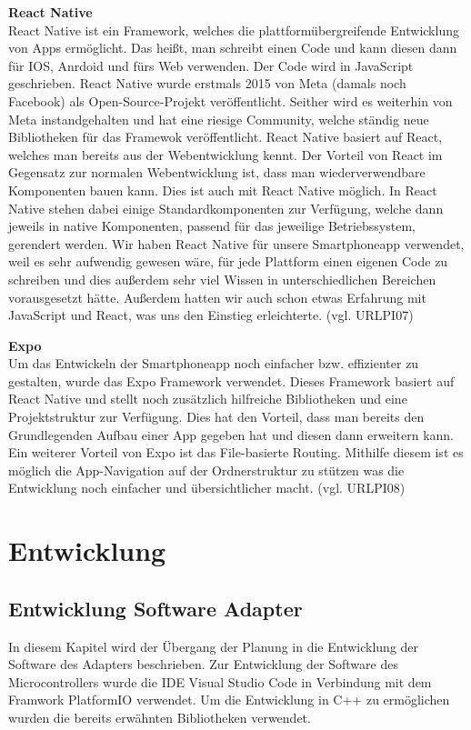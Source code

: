 \documentclass[]{article}
\begin{document}
\textbf{React Native} \\
React Native ist ein Framework, welches die plattformübergreifende Entwicklung von Apps ermöglicht. Das heißt, man schreibt einen Code und kann diesen dann für IOS, Anrdoid und fürs Web verwenden. Der Code wird in JavaScript geschrieben. React Native wurde erstmals 2015 von Meta (damals noch Facebook) als Open-Source-Projekt veröffentlicht. Seither wird es weiterhin von Meta instandgehalten und hat eine riesige Community, welche ständig neue Bibliotheken für das Framewok veröffentlicht. React Native basiert auf React, welches man bereits aus der Webentwicklung kennt. Der Vorteil von React im Gegensatz zur normalen Webentwicklung ist, dass man wiederverwendbare Komponenten bauen kann. Dies ist auch mit React Native möglich. In React Native stehen dabei einige Standardkomponenten zur Verfügung, welche dann jeweils in native Komponenten, passend für das jeweilige Betriebssystem, gerendert werden. 
Wir haben React Native für unsere Smartphoneapp verwendet, weil es sehr aufwendig gewesen wäre, für jede Plattform einen eigenen Code zu schreiben und dies außerdem sehr viel Wissen in unterschiedlichen Bereichen vorausgesetzt hätte. Außerdem hatten wir auch schon etwas Erfahrung mit JavaScript und React, was uns den Einstieg erleichterte.
(vgl. URLPI07)

\textbf{Expo} \\
Um das Entwickeln der Smartphoneapp noch einfacher bzw. effizienter zu gestalten, wurde das Expo Framework verwendet. Dieses Framework basiert auf React Native und stellt noch zusätzlich hilfreiche Bibliotheken und eine Projektstruktur zur Verfügung. Dies hat den Vorteil, dass man bereits den Grundlegenden Aufbau einer App gegeben hat und diesen dann erweitern kann. Ein weiterer Vorteil von Expo ist das File-basierte Routing. Mithilfe diesem ist es möglich die App-Navigation auf der Ordnerstruktur zu stützen was die Entwicklung noch einfacher und übersichtlicher macht.
(vgl. URLPI08)

\section{Entwicklung}
\subsection{Entwicklung Software Adapter}
In diesem Kapitel wird der Übergang der Planung in die Entwicklung der Software des Adapters beschrieben. 
Zur Entwicklung der Software des Microcontrollers wurde die IDE Visual Studio Code in Verbindung mit dem Framwork PlatformIO verwendet. Um die Entwicklung in C++ zu ermöglichen wurden die bereits erwähnten Bibliotheken verwendet.
\end{document}
